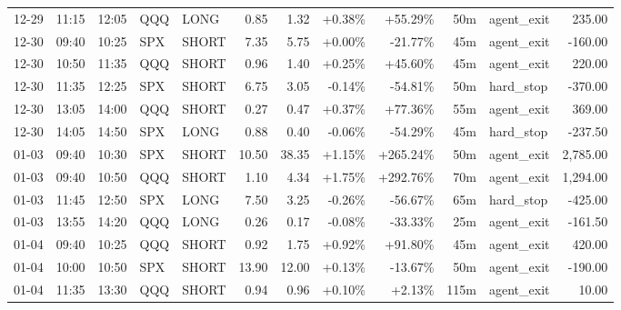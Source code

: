 \documentclass[11pt,a4paper,twoside]{article}
\begin{document}
\begin{center}
\begin{longtable}{>{\color{txtmain}}l l l l l r r r r r >{\color{txtmain}}l r}
12-29 & 11:15 & 12:05 & QQQ & LONG & 0.85 & 1.32 & \textcolor{wingreen}{+0.38\%} & \textcolor{wingreen}{+55.29\%} & 50m & agent\_exit & \textcolor{wingreen}{235.00} \\
12-30 & 09:40 & 10:25 & SPX & SHORT & 7.35 & 5.75 & \textcolor{wingreen}{+0.00\%} & \textcolor{lossred}{-21.77\%} & 45m & agent\_exit & \textcolor{lossred}{-160.00} \\
12-30 & 10:50 & 11:35 & QQQ & SHORT & 0.96 & 1.40 & \textcolor{wingreen}{+0.25\%} & \textcolor{wingreen}{+45.60\%} & 45m & agent\_exit & \textcolor{wingreen}{220.00} \\
12-30 & 11:35 & 12:25 & SPX & SHORT & 6.75 & 3.05 & \textcolor{lossred}{-0.14\%} & \textcolor{lossred}{-54.81\%} & 50m & hard\_stop & \textcolor{lossred}{-370.00} \\
12-30 & 13:05 & 14:00 & QQQ & SHORT & 0.27 & 0.47 & \textcolor{wingreen}{+0.37\%} & \textcolor{wingreen}{+77.36\%} & 55m & agent\_exit & \textcolor{wingreen}{369.00} \\
12-30 & 14:05 & 14:50 & SPX & LONG & 0.88 & 0.40 & \textcolor{lossred}{-0.06\%} & \textcolor{lossred}{-54.29\%} & 45m & hard\_stop & \textcolor{lossred}{-237.50} \\
01-03 & 09:40 & 10:30 & SPX & SHORT & 10.50 & 38.35 & \textcolor{wingreen}{+1.15\%} & \textcolor{wingreen}{+265.24\%} & 50m & agent\_exit & \textcolor{wingreen}{2,785.00} \\
01-03 & 09:40 & 10:50 & QQQ & SHORT & 1.10 & 4.34 & \textcolor{wingreen}{+1.75\%} & \textcolor{wingreen}{+292.76\%} & 70m & agent\_exit & \textcolor{wingreen}{1,294.00} \\
01-03 & 11:45 & 12:50 & SPX & LONG & 7.50 & 3.25 & \textcolor{lossred}{-0.26\%} & \textcolor{lossred}{-56.67\%} & 65m & hard\_stop & \textcolor{lossred}{-425.00} \\
01-03 & 13:55 & 14:20 & QQQ & LONG & 0.26 & 0.17 & \textcolor{lossred}{-0.08\%} & \textcolor{lossred}{-33.33\%} & 25m & agent\_exit & \textcolor{lossred}{-161.50} \\
01-04 & 09:40 & 10:25 & QQQ & SHORT & 0.92 & 1.75 & \textcolor{wingreen}{+0.92\%} & \textcolor{wingreen}{+91.80\%} & 45m & agent\_exit & \textcolor{wingreen}{420.00} \\
01-04 & 10:00 & 10:50 & SPX & SHORT & 13.90 & 12.00 & \textcolor{wingreen}{+0.13\%} & \textcolor{lossred}{-13.67\%} & 50m & agent\_exit & \textcolor{lossred}{-190.00} \\
01-04 & 11:35 & 13:30 & QQQ & SHORT & 0.94 & 0.96 & \textcolor{wingreen}{+0.10\%} & \textcolor{wingreen}{+2.13\%} & 115m & agent\_exit & \textcolor{wingreen}{10.00} \\

\end{longtable}
\end{center}
\end{document}
